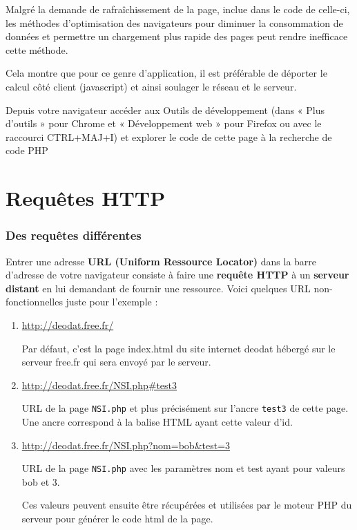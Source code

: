 \medskip

\rem Malgré la demande de rafraîchissement de la page, inclue dans le code de celle-ci, les méthodes d'optimisation des navigateurs pour diminuer la consommation de données et permettre un chargement plus rapide des pages peut rendre inefficace cette méthode.

Cela montre que pour ce genre d'application, il est préférable de déporter le calcul côté client (javascript) et ainsi soulager le réseau et le serveur. 

\medskip

\exer Depuis votre navigateur accéder aux Outils de développement (dans « Plus d'outils » pour Chrome et « Développement web » pour Firefox ou avec le raccourci CTRL+MAJ+I) et explorer le code de cette page à la recherche de code PHP


\section{Requêtes HTTP}

\subsubsection{Des requêtes différentes}

Entrer une adresse \textbf{URL (Uniform Ressource Locator)} dans la barre d'adresse de votre navigateur consiste à faire une \textbf{requête HTTP} à un \textbf{serveur distant} en lui demandant de fournir une ressource.
Voici quelques URL non-fonctionnelles juste pour l'exemple :

\begin{enumerate}
	\item \url{http://deodat.free.fr/}
    
    Par défaut, c'est la page index.html du site internet deodat hébergé sur le serveur free.fr qui sera envoyé par le serveur.
    \item \url{http://deodat.free.fr/NSI.php#test3}
    
    URL de la page \verb+NSI.php+ et plus précisément sur l'ancre \verb+test3+ de cette page. Une ancre correspond à la balise HTML ayant cette valeur d'id.
    
    \item \url{http://deodat.free.fr/NSI.php?nom=bob&test=3}
    
    URL de la page \verb+NSI.php+ avec les paramètres nom et test ayant pour valeurs bob et 3.
    
    Ces valeurs peuvent ensuite être récupérées et utilisées par le moteur PHP du serveur pour générer le code html de la page.
\end{enumerate}
    
